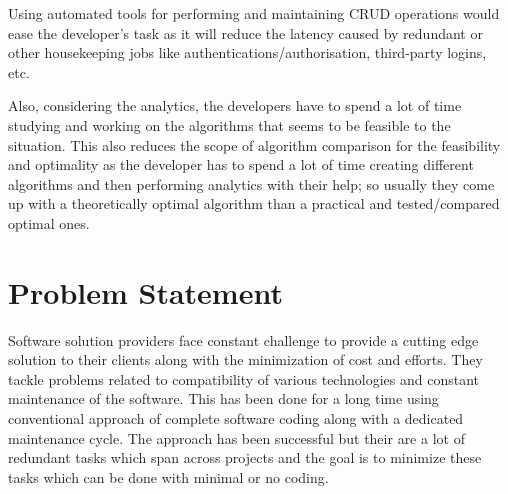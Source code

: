\documentclass[a4paper,12pt]{report}
\begin{document}
    Using automated tools for performing and maintaining CRUD operations would ease the developer's task as it will reduce the latency caused by redundant or other housekeeping jobs like authentications/authorisation, third-party logins, etc.
    
    Also, considering the analytics, the developers have to spend a lot of time studying and working on the algorithms that seems to be feasible to the situation. This also reduces the scope of algorithm comparison for the feasibility and optimality as the developer has to spend a lot of time creating different algorithms and then performing analytics with their help; so usually they come up with a theoretically optimal algorithm than a practical and tested/compared optimal ones.
    \section{Problem Statement}
    Software solution providers face constant challenge to provide a cutting edge solution to their clients along with the minimization of cost and efforts. They tackle problems related to compatibility of various technologies and constant maintenance of the software. This has been done for a long time using conventional approach of complete software coding along with a dedicated maintenance cycle. The approach has been successful but their are a lot of redundant tasks which span across projects and the goal is to minimize these tasks which can be done with minimal or no coding.    
    
    \newpage
\end{document}
